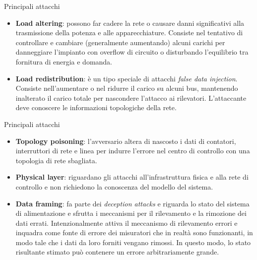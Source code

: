 \documentclass{beamer}
\begin{document}
\begin{frame}{Principali attacchi}
    \begin{itemize}
        \item \textbf{Load altering}: possono far cadere la rete o causare danni significativi alla trasmissione della potenza e alle apparecchiature.
        Consiste nel tentativo di controllare e cambiare (generalmente aumentando) alcuni carichi per danneggiare l'impianto con overflow di circuito
        o disturbando l'equilibrio tra fornitura di energia e domanda.
        \item \textbf{Load redistribution}: è un tipo speciale di attacchi \textit{false data injection}. Consiste nell'aumentare o nel ridurre 
        il carico su alcuni bus, mantenendo inalterato il carico totale per nascondere l'attacco ai rilevatori. L'attaccante deve conoscere le informazioni
        topologiche della rete.
    \end{itemize}
\end{frame}

\begin{frame}{Principali attacchi}
    \begin{itemize}
        \item \textbf{Topology poisoning}: l'avversario altera di nascosto i dati di contatori, interruttori di rete e linea per indurre l'errore
        nel centro di controllo con una topologia di rete sbagliata. 
        \item \textbf{Physical layer}: riguardano gli attacchi all'infrastruttura fisica e alla rete di controllo e non richiedono la conoscenza del 
        modello del sistema.
        \item \textbf{Data framing}: fa parte dei \textit{deception attacks} e riguarda lo stato del sistema di alimentazione e sfrutta i meccanismi 
        per il rilevamento e la rimozione dei dati errati. Intenzionalmente attiva il meccanismo di rilevamento errori e inquadra come fonte di errore dei
        misuratori che in realtà sono funzionanti, in modo tale che i dati da loro forniti vengano rimossi. In questo modo, lo stato risultante stimato
        può contenere un errore arbitrariamente grande.
    \end{itemize}
\end{frame}
\end{document}
